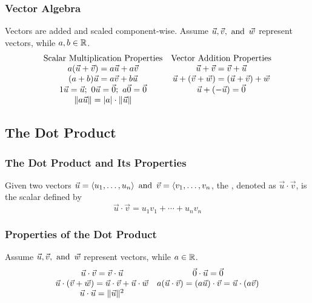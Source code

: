 \subsubsection*{Vector Algebra}
Vectors are added and scaled component-wise. Assume $\vec{u},\vec{v}, \operatorname{~\text{and}~} \vec{w}$ represent vectors, while $a,b \in \mathbb{R}$.
\[
    \begin{array}{cc}
        \text{Scalar Multiplication Properties}                    & \text{Vector Addition Properties}                             \\
        a(\vec{u}+\vec{v}) = a\vec{u} + a\vec{v}                   & \vec{u} + \vec{v} = \vec{v} + \vec{u}                         \\
        (a+b)\vec{u} = a\vec{v} + b\vec{u}                         & \vec{u} + (\vec{v} + \vec{w}) = (\vec{u} + \vec{v}) + \vec{w} \\
        1\vec{u} = \vec{u};~0\vec{u} = \vec{0};~a\vec{0} = \vec{0} & \vec{u}+(-\vec{u}) = \vec{0}                                  \\
        \lVert a\vec{u} \rVert = |a| \cdot \lVert \vec{u} \rVert
    \end{array}
\]

\subsection{The Dot Product}

\subsubsection*{The Dot Product and Its Properties}
Given two vectors $\vec{u} = \langle u_1, \ldots, u_n \rangle \operatorname{~\text{and}~} \vec{v} = \langle v_1, \ldots, v_n$, the , denoted as $\vec{u} \cdot \vec{v}$, is the scalar defined by
\[
    \vec{u} \cdot \vec{v} = u_1v_1 + \cdots + u_nv_n
\]

\subsubsection*{Properties of the Dot Product}
Assume $\vec{u},\vec{v}, \operatorname{~\text{and}~} \vec{w}$ represent vectors, while $a \in \mathbb{R}$.
\[
    \begin{array}{cc}
        \vec{u} \cdot \vec{v} = \vec{v} \cdot \vec{u}                                     & \vec{0} \cdot \vec{u} = \vec{0}                                                \\
        \vec{u} \cdot (\vec{v} + \vec{w}) = \vec{u} \cdot \vec{v} + \vec{u} \cdot \vec{w} & a(\vec{u} \cdot \vec{v}) = (a\vec{u}) \cdot \vec{v} = \vec{u} \cdot (a\vec{v}) \\
        \vec{u} \cdot \vec{u} = \lVert \vec{u} \rVert^2
    \end{array}
\]

